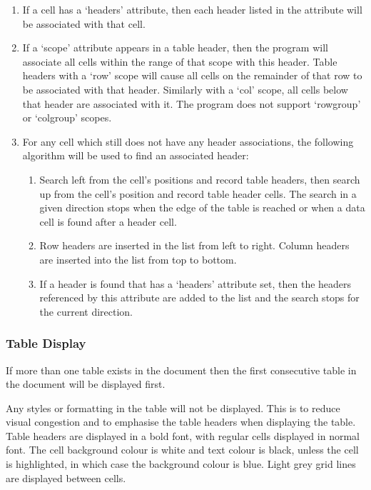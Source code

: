 \begin{enumerate}

\item If a cell has a `headers' attribute, then each header listed in the
attribute will be associated with that cell.

\item If a `scope' attribute appears in a table header, then the program will
associate all cells within the range of that scope with this header. Table
headers with a `row' scope will cause all cells on the remainder of that row to
be associated with that header. Similarly with a `col' scope, all cells below
that header are associated with it. The program does not support `rowgroup' or
`colgroup' scopes.

\item For any cell which still does not have any header associations, 
the following algorithm will be used to find an associated header:

\begin{enumerate}

\item Search left from the cell's positions and record table headers, then
search up from the cell's position and record table header cells. The search in
a given direction stops when the edge of the table is reached or when a data
cell is found after a header cell.

\item Row headers are inserted in the list from left to right. Column headers
are inserted into the list from top to bottom.

\item If a header is found that has a `headers' attribute set, then the headers
referenced by this attribute are added to the list and the search stops for the
current direction.

\end{enumerate}

\end{enumerate}

\subsubsection{Table Display}

If more than one table exists in the document then the first consecutive table
in the document will be displayed first. 

Any styles or formatting in the table will not be displayed. This is to reduce
visual congestion and to emphasise the table headers when displaying the table.
Table headers are displayed in a bold font, with regular cells displayed in
normal font. The cell background colour is white and text colour is black,
unless the cell is highlighted, in which case the background colour is blue. Light grey grid lines are displayed between cells. 

